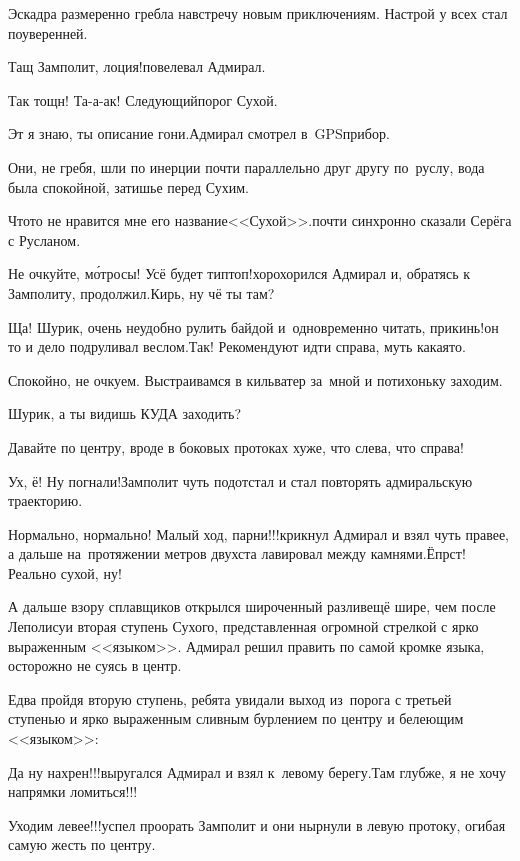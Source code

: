 Эскадра размеренно гребла навстречу новым приключениям. Настрой у всех стал поуверенней.

\diagdash Тащ Замполит, лоция!\mdash повелевал Адмирал.

\diagdash Так тощн! Та-а-ак! Следующий\mdash порог Сухой.

\diagdash Эт я знаю, ты описание гони.\mdash Адмирал смотрел в~GPS\sdash прибор.

Они, не гребя, шли по инерции почти параллельно друг другу по~руслу, вода была спокойной, затишье перед Сухим.

\diagdash Что\sdash то не нравится мне его название\mdash <<Сухой>>.\mdash почти синхронно сказали Серёга с Русланом.

\diagdash Не очкуйте, м\'{о}тросы! Усё будет тип\sdash топ!\mdash хорохорился Адмирал и, обратясь к Замполиту, продолжил.\mdash Кирь, ну чё ты там?

\diagdash Ща! Шурик, очень неудобно рулить байдой и~одновременно читать, прикинь!\mdash он то и дело подруливал веслом.\mdash Так! Рекомендуют идти справа, муть какая\sdash то.

\diagdash Спокойно, не очкуем. Выстраивамся в кильватер за~мной и потихоньку заходим. 

\diagdash Шурик, а ты видишь КУДА заходить?

\diagdash Давайте по центру, вроде в боковых протоках хуже, что слева, что справа!

\diagdash Ух, ё! Ну погнали!\mdash Замполит чуть подотстал и стал повторять адмиральскую траекторию.

\diagdash Нормально, нормально! Малый ход, парни!!!\mdash крикнул Адмирал и взял чуть правее, а дальше на~протяжении метров двухста лавировал между камнями.\mdash Ёпрст! Реально сухой, ну!

А дальше взору сплавщиков открылся широченный разлив\mdash ещё шире, чем после Леполису\mdash и вторая ступень Сухого, представленная огромной стрелкой с ярко выраженным <<языком>>. Адмирал решил править по самой кромке языка, осторожно не суясь в центр.

Едва пройдя вторую ступень, ребята увидали выход из~порога с третьей ступенью и ярко выраженным сливным бурлением по центру и белеющим <<языком>>:

\diagdash Да ну нахрен!!!\mdash выругался Адмирал и взял к~левому берегу.\mdash Там глубже, я не хочу напрямки ломиться!!!

\diagdash Уходим левее!!!\mdash успел проорать Замполит и они нырнули в левую протоку, огибая самую жесть по центру.

